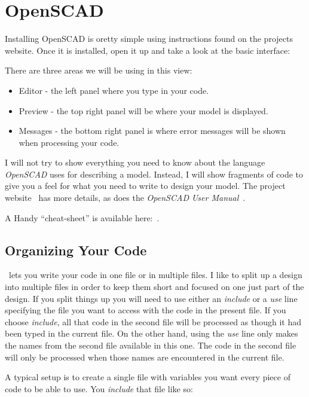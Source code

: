 \section{OpenSCAD}

Installing OpenSCAD is oretty simple using instructions found on the projects
website. Once it is installed, open it up and take a look at the basic
interface:


There are three areas we will be using in this view:

\begin{itemize}
\item{Editor - the left panel where you type in your code.}
\item{Preview - the top right panel will be where your model is displayed.}
\item{Messages - the bottom right panel is where error messages will be shown
when processing your code.}
\end{itemize}

I will not try to show everything you need to know about the language {\it
OpenSCAD} uses for describing a model. Instead, I will show fragments of code
to give you a feel for what you need to write to design your model. The project
website~\cite{blackr} has more details, as does the {\it OpenSCAD} {\it User
Manual}~\cite{userman}.

A Handy ``cheat-sheet'' is available here:~\cite{osccheat}.

\subsection{Organizing Your Code}

\osc\ lets you write your code in one file or in multiple files. I like to
split up a design into multiple files in order to keep them short and focused
on one just part of the design. If you split things up you will need to use either
an {\it include} or a {\it use} line specifying the file you want to access with
the code in the present file. If you choose {\it include}, all that code in the
second file will be processed as though it had been typed in the current file.
On the other hand, using the {\it use} line only makes the names from the
second file available in this one. The code in the second file will only be
processed when those names are encountered in the current file.

A typical setup is to create a single file with variables you want every piece
of code to be able to use. You {\it include} that file like so:


